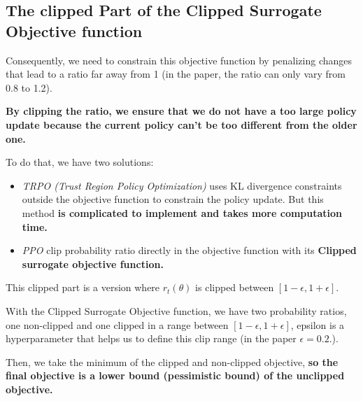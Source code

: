 \documentclass[11pt,a4paper]{article}
\begin{document}
\subsection{The clipped Part of the Clipped Surrogate Objective function}\label{the-clipped-part-of-the-clipped-surrogate-objective-function}


Consequently, we need to constrain this objective function by penalizing changes that lead to a ratio far away from 1 (in the paper, the ratio can only vary from 0.8 to 1.2).

\textbf{By clipping the ratio, we ensure that we do not have a too large policy update because the current policy can't be too different from the older one.}

To do that, we have two solutions:

\begin{itemize}
\tightlist
\item
  \emph{TRPO (Trust Region Policy Optimization)} uses KL divergence constraints outside the objective function to constrain the policy update. But this method \textbf{is complicated to implement and takes more computation time.}
\item
  \emph{PPO} clip probability ratio directly in the objective function with its \textbf{Clipped surrogate objective function.}
\end{itemize}


This clipped part is a version where \(r_t(\theta)\) is clipped between \([1 - \epsilon, 1 + \epsilon]\).

With the Clipped Surrogate Objective function, we have two probability ratios, one non-clipped and one clipped in a range between \([1 - \epsilon, 1 + \epsilon]\), epsilon is a hyperparameter that helps us to define this clip range (in the paper \(\epsilon = 0.2\).).

Then, we take the minimum of the clipped and non-clipped objective, \textbf{so the final objective is a lower bound (pessimistic bound) of the unclipped objective.}
\end{document}
